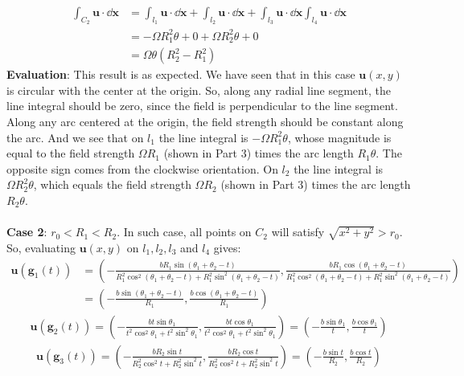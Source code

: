 \documentclass{article}
\begin{document}
\begin{enumerate}
\begin{enumerate}
\begin{align*}
     \int_{C_2} \mathbf{u}\cdot \dd\mathbf{x}
     &= \int_{l_1} \mathbf{u}\cdot \dd\mathbf{x} +\int_{l_2} \mathbf{u}\cdot \dd\mathbf{x} +\int_{l_3} \mathbf{u}\cdot \dd\mathbf{x}
     \int_{l_4} \mathbf{u}\cdot \dd\mathbf{x}\\
     &= -\Omega R_1^2\theta + 0 + \Omega R_2^2 \theta + 0 \\
     &= \Omega \theta (R_2^2 - R_1^2)
   \end{align*}
   \textbf{Evaluation}: This result is as expected. We have seen that in this case \(\mathbf{u}(x,y)\) is circular with the center at
   the origin. So, along any radial line segment, the line integral should be zero, since the field is perpendicular to the line segment. Along any arc centered at the origin, the field strength should be constant along the arc. And we see that on \(l_1\)
   the line integral is \(-\Omega R_1^2\theta\), whose magnitude is equal to the field strength \(\Omega R_1\) (shown in Part 3) times the arc length
   \(R_1\theta\). The opposite sign comes from the clockwise orientation. On \(l_2\) the line integral is \(\Omega R_2^2\theta\),
   which equals the field strength \(\Omega R_2\) (shown in Part 3) times the arc length \(R_2\theta\).
   \\
   \\
   \textbf{Case 2}: \(r_0 <R_1<R_2\). In such case, all points on \(C_2\) will satisfy \(\sqrt{x^2+y^2} > r_0\).
   So, evaluating \(\mathbf{u}(x,y)\) on \(l_1, l_2, l_3\) and \(l_4\) gives:\\
   \begin{align*}
     \mathbf{u}(\mathbf{g}_1(t))
     &= \left(-\frac{bR_1 \sin(\theta_1 + \theta_2 -t )  }{R_1^2 \cos^2(\theta_1 + \theta_2 -t ) +R_1^2 \sin^2(\theta_1 + \theta_2 -t ) }, \frac{bR_1 \cos (\theta_1 + \theta_2 -t )  }{R_1^2 \cos^2(\theta_1 + \theta_2 -t ) +R_1^2 \sin^2(\theta_1 + \theta_2 -t ) }\right)\\
     &= \left(-\frac{b \sin(\theta_1 + \theta_2 -t )}{R_1}, \frac{b \cos(\theta_1 + \theta_2 -t )}{R_1}\right)
   \end{align*}
   \begin{align*}
     \mathbf{u}(\mathbf{g}_2(t)) = \left(-\frac{b t \sin \theta_1}{t^2 \cos^2 \theta_1 +t^2 \sin^2 \theta_1}, \frac{b t \cos \theta_1}{t^2 \cos^2 \theta_1 +t^2 \sin^2 \theta_1}\right) = \left(-\frac{b\sin\theta_1}{t}, \frac{b\cos\theta_1}{t}\right)
   \end{align*}
   \begin{align*}
     \mathbf{u}(\mathbf{g}_3(t)) =  \left(-\frac{bR_2\sin t}{R_2^2\cos^2 t+R_2^2\sin^2 t}, \frac{bR_2\cos t}{R_2^2\cos^2 t+R_2^2\sin^2 t}\right) = \left(-\frac{b\sin t}{R_2}, \frac{b\cos t}{R_2}\right)

\end{align*}
\end{enumerate}
\end{enumerate}
\end{document}
